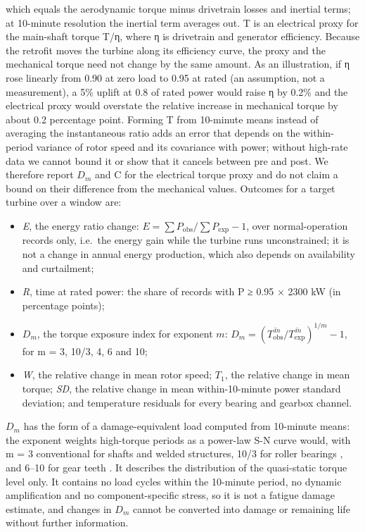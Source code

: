 \documentclass[preprint,12pt]{elsarticle}
\begin{document}
which equals the aerodynamic torque minus drivetrain losses and inertial terms; at 10-minute resolution the inertial term averages out. T is an electrical proxy for the main-shaft torque T/η, where η is drivetrain and generator efficiency. Because the retrofit moves the turbine along its efficiency curve, the proxy and the mechanical torque need not change by the same amount. As an illustration, if η rose linearly from 0.90 at zero load to 0.95 at rated (an assumption, not a measurement), a 5\% uplift at 0.8 of rated power would raise η by 0.2\% and the electrical proxy would overstate the relative increase in mechanical torque by about 0.2 percentage point. Forming T from 10-minute means instead of averaging the instantaneous ratio adds an error that depends on the within-period variance of rotor speed and its covariance with power; without high-rate data we cannot bound it or show that it cancels between pre and post. We therefore report \(D_{m}\) and C for the electrical torque proxy and do not claim a bound on their difference from the mechanical values. Outcomes for a target turbine over a window are:

\begin{itemize}
\item
  \emph{E}, the energy ratio change: \(E = \sum P_\mathrm{obs} / \sum P_\mathrm{exp} - 1\), over normal-operation records only, i.e.~the energy gain while the turbine runs unconstrained; it is not a change in annual energy production, which also depends on availability and curtailment;
\item
  \emph{R}, time at rated power: the share of records with P ≥ 0.95 × 2300 kW (in percentage points);
\item
  \(D_{m}\), the torque exposure index for exponent \(m\): \(D_{m} = \left( \overline{T_\mathrm{obs}^{\,m}} \big/ \overline{T_\mathrm{exp}^{\,m}} \right)^{1/m} - 1\), for m = 3, 10/3, 4, 6 and 10;
\item
  \emph{W}, the relative change in mean rotor speed; \(T_1\), the relative change in mean torque; \emph{SD}, the relative change in mean within-10-minute power standard deviation; and temperature residuals for every bearing and gearbox channel.
\end{itemize}

\(D_{m}\) has the form of a damage-equivalent load \cite{burton11} computed from 10-minute means: the exponent weights high-torque periods as a power-law S-N curve would, with m = 3 conventional for shafts and welded structures, 10/3 for roller bearings \cite{iso281}, and 6--10 for gear teeth \cite{nejad14}. It describes the distribution of the quasi-static torque level only. It contains no load cycles within the 10-minute period, no dynamic amplification and no component-specific stress, so it is not a fatigue damage estimate, and changes in \(D_{m}\) cannot be converted into damage or remaining life without further information.
\end{document}
